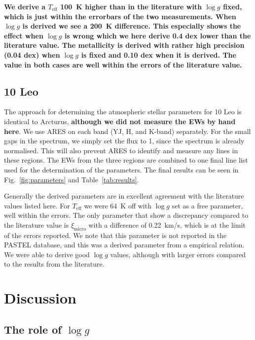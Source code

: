 \documentclass{aa}
\begin{document}
{\bf We derive a $T_\mathrm{eff}$ \SI{100}{K} higher than in the literature with $\log g$ fixed,
which is just within the errorbars of the two measurements. When $\log g$ is derived we see a
\SI{200}{K} difference. This especially shows the effect when $\log g$ is wrong which we here derive
0.4 dex lower than the literature value. The metallicity is derived with rather high precision (0.04
dex) when $\log g$ is fixed and 0.10 dex when it is derived. The value in both cases are well within
the errors of the literature value.}


\subsection{10 Leo}
\label{sec:10Leo}

The approach for determining the atmospheric stellar parameters for 10 Leo is identical to Arcturus,
{\bf although we did not measure the EWs by hand here}. We use ARES on each band (YJ, H, and K-band)
separately. For the small gaps in the spectrum, we simply set the flux to 1, since the spectrum is
already normalised. This will also prevent ARES to identify and measure any lines in these regions.
The EWs from the three regions are combined to one final line list used for the determination of the
parameters. The final results can be seen in Fig.~\ref{fig:parameters} and Table~\ref{tab:results}.

Generally the derived parameters are in excellent agreement with the literature
values listed here.  For $T_\mathrm{eff}$ we were \SI{64}{K} off with $\log
g$ set as a free parameter, well within the errors. The only parameter that show
a discrepancy compared to the literature value is $\xi_\mathrm{micro}$ with a
difference of \SI{0.22}{km/s}, which is at the limit of the errors reported. We
note that this parameter is not reported in the PASTEL database, and this was a
derived parameter from a empirical relation. We were able to derive good $\log
g$ values, although with larger errors compared to the results from the
literature.



\section{Discussion}
\label{sec:discussion}

\subsection{The role of $\log g$}
\end{document}
